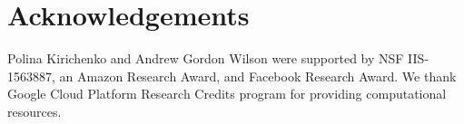 \documentclass{article}
\begin{document}
\clearpage
\section*{Acknowledgements}\label{sec:ack}
Polina Kirichenko and Andrew Gordon Wilson were supported by NSF IIS-1563887, an Amazon Research Award, and Facebook Research Award.
We thank Google Cloud Platform Research Credits program for providing computational resources.





\clearpage

\end{document}
